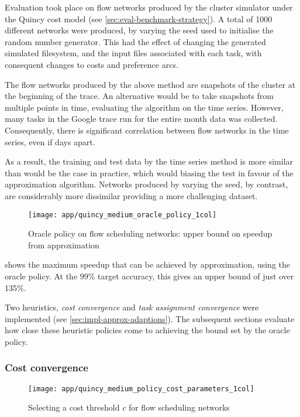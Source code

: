 Evaluation took place on flow networks produced by the cluster simulator under the Quincy cost model (see \cref{sec:eval-benchmark-strategy}). A total of 1000 different networks were produced, by varying the seed used to initialise the random number generator. This had the effect of changing the generated simulated filesystem, and the input files associated with each task, with consequent changes to costs and preference arcs.

The flow networks produced by the above method are snapshots of the cluster at the beginning of the trace. An alternative would be to take snapshots from multiple points in time, evaluating the algorithm on the time series. However, many tasks in the Google trace run for the entire month data was collected. Consequently, there is significant correlation between flow networks in the time series, even if days apart.

As a result, the training and test data by the time series method is more similar than would be the case in practice, which would biasing the test in favour of the approximation algorithm. Networks produced by varying the seed, by contrast, are considerably more dissimilar providing a more challenging dataset.

\begin{figure}
    \centering
    \texttt{[image: app/quincy\_medium\_oracle\_policy\_1col]}
    \caption{Oracle policy on flow scheduling networks: upper bound on speedup from approximation}
    \label{fig:app-quincy-medium-oracle}
\end{figure}

 shows the maximum speedup that can be achieved by approximation, using the oracle policy. At the 99\% target accuracy, this gives an upper bound of just over 135\%.

Two heuristics, \emph{cost convergence} and \emph{task assignment convergence} were implemented (see \cref{sec:impl-approx-adaptions}). The subsequent sections evaluate how close these heuristic policies come to achieving the bound set by the oracle policy.

\subsubsection{Cost convergence}

\begin{figure}
    \centering
    \texttt{[image: app/quincy\_medium\_policy\_cost\_parameters\_1col]}
    \caption{Selecting a cost threshold $c$ for flow scheduling networks}
    \label{fig:app-quincy-medium-cost-parameters}
\end{figure}

